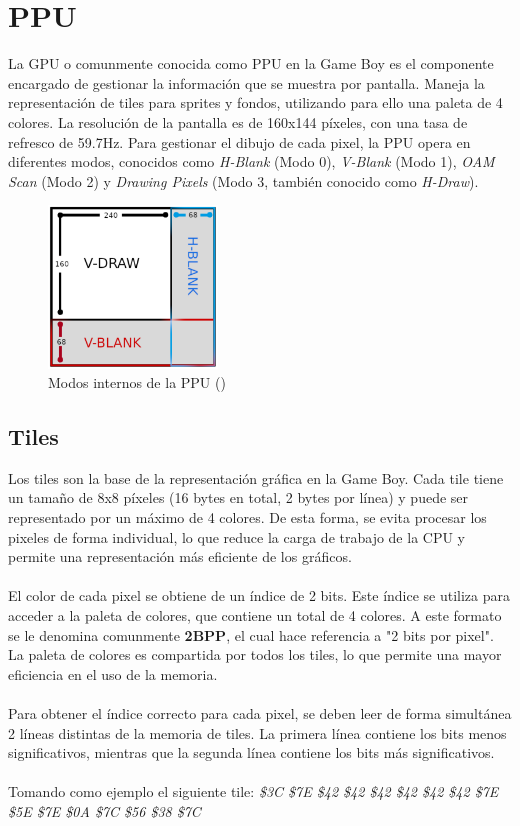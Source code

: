 \section{PPU}

La GPU o comunmente conocida como PPU en la Game Boy es el componente encargado de gestionar la información que se muestra por pantalla. Maneja la representación de tiles para sprites y fondos, utilizando para ello una paleta de 4 colores. La resolución de la pantalla es de 160x144 píxeles, con una tasa de refresco de 59.7Hz. Para gestionar el dibujo de cada pixel, la PPU opera en diferentes modos, conocidos como \textit{H-Blank} (Modo 0), \textit{V-Blank} (Modo 1), \textit{OAM Scan} (Modo 2) y \textit{Drawing Pixels} (Modo 3, también conocido como \textit{H-Draw}).

\begin{figure}[H]
    \centering
    \includegraphics[width=0.4\textwidth]{include/images/ppu_modes.png}
    \caption{Modos internos de la PPU (\cite{goldensacra})}
    \label{figure:ppu_modes}
\end{figure}

\subsection{Tiles}

Los tiles son la base de la representación gráfica en la Game Boy. Cada tile tiene un tamaño de 8x8 píxeles (16 bytes en total, 2 bytes por línea) y puede ser representado por un máximo de 4 colores. De esta forma, se evita procesar los pixeles de forma individual, lo que reduce la carga de trabajo de la CPU y permite una representación más eficiente de los gráficos.
\\\\
El color de cada pixel se obtiene de un índice de 2 bits. Este índice se utiliza para acceder a la paleta de colores, que contiene un total de 4 colores. A este formato se le denomina comunmente \textbf{2BPP}, el cual hace referencia a "2 bits por pixel". La paleta de colores es compartida por todos los tiles, lo que permite una mayor eficiencia en el uso de la memoria.
\\\\ 
Para obtener el índice correcto para cada pixel, se deben leer de forma simultánea 2 líneas distintas de la memoria de tiles. La primera línea contiene los bits menos significativos, mientras que la segunda línea contiene los bits más significativos.
\\\\
Tomando como ejemplo el siguiente tile: \textit{\$3C \$7E \$42 \$42 \$42 \$42 \$42 \$42 \$7E \$5E \$7E \$0A \$7C \$56 \$38 \$7C}

